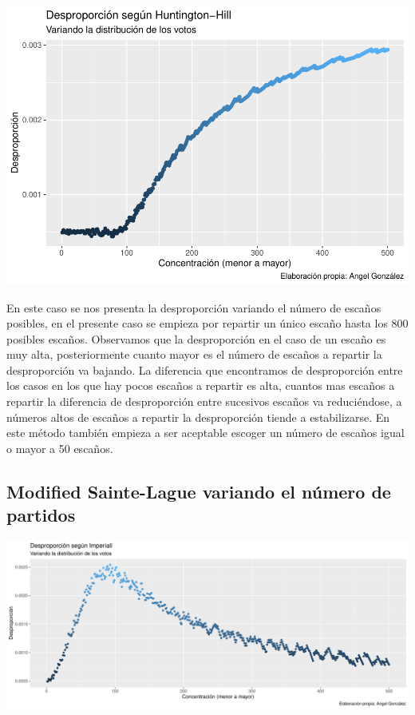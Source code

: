 \documentclass[12pt,a4paper,]{book}
\numberwithin{dummy}{section}
\theoremstyle{ocrenumbox}
\theoremstyle{blacknumex}
\theoremstyle{blacknumbox}
\theoremstyle{ocrenum}
\theoremstyle{ocrenum}
\begin{document}
\begin{center}\includegraphics[width=0.95\linewidth]{figurasR/unnamed-chunk-28-1} \end{center}

En este caso se nos presenta la desproporción variando el número de
escaños posibles, en el presente caso se empieza por repartir un único
escaño hasta los 800 posibles escaños. Observamos que la desproporción
en el caso de un escaño es muy alta, posteriormente cuanto mayor es el
número de escaños a repartir la desproporción va bajando. La diferencia
que encontramos de desproporción entre los casos en los que hay pocos
escaños a repartir es alta, cuantos mas escaños a repartir la diferencia
de desproporción entre sucesivos escaños va reduciéndose, a números
altos de escaños a repartir la desproporción tiende a estabilizarse. En
este método también empieza a ser aceptable escoger un número de escaños
igual o mayor a 50 escaños.

\hypertarget{modified-sainte-lague-variando-el-nuxfamero-de-partidos}{%
\subsection{Modified Sainte-Lague variando el número de
partidos}\label{modified-sainte-lague-variando-el-nuxfamero-de-partidos}}

\begin{center}\includegraphics[width=0.95\linewidth]{figurasR/unnamed-chunk-29-1} \end{center}
\end{document}
